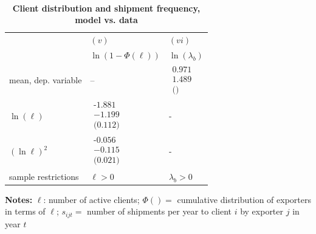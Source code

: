 \documentclass[12pt]{article}
\begin{document}
\begin{table}[tbp]
\caption{\textbf{Client distribution and shipment frequency, model vs. data}}
\label{tab:client_dist_model_data}\centering
{\small \ }
\par
{\small 
\begin{tabular}{lll}
\hline\hline
& $(v)$ & $(vi)$ \\ 
& $\ln (1-\Phi (\ell ))$ & $\ln (\lambda _{b})$ \\ \hline
mean, dep. variable & -- & $%
\begin{array}{c}
\text{0.971} \\ 
1.489 \\ 
\text{()}%
\end{array}%
$ \\ \cline{2-3}
$\ln (\ell )$ & $%
\begin{array}{c}
\text{-1.881} \\ 
-1.199 \\ 
\text{(0.112)}%
\end{array}%
$ & - \\ \cline{2-3}
$(\ln \ell )^{2}$ & $%
\begin{array}{c}
\text{-0.056} \\ 
-0.115 \\ 
\text{(0.021)}%
\end{array}%
$ & - \\ \hline
sample restrictions & $\ell >0$ & $\lambda _{b}>0$ \\ \hline
\end{tabular}
} \endcenter%
\begin{tablenotes}
\item \textbf{Notes:} $\ell$: number of active clients;  $\Phi ( ) = $ cumulative distribution of exporters in terms of  $\ell$;
$s_{ijt}=$ number of shipments per year to client $i$ by exporter $j$ in year $t$
\end{tablenotes}
\end{table}
\end{document}
